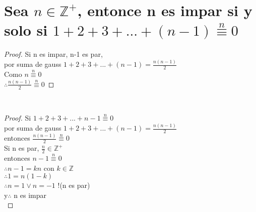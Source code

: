 \section{Sea $n\in \mathbb{Z}^+$, entonce n es impar si y solo si $1+2+3+...+(n-1) \stackrel{n}{\equiv} 0$}
\begin{proof}
    Si n es impar, n-1 es par,\\
    por suma de gauss $1+2+3+...+(n-1) =\frac{n(n-1)}{2}$\\
    Como  $n \stackrel{n}{ \equiv }0$\\
    $\therefore\frac{n(n-1)}{2}\stackrel{n}{ \equiv }0$
\end{proof}\\
\begin{proof}
    Si $ 1+2+3+...+n-1\stackrel{n}{ \equiv }0$\\
    por suma de gauss $1+2+3+...+(n-1) =\frac{n(n-1)}{2}$\\
    entonces  $\frac{n(n-1)}{2}\stackrel{n}{ \equiv }0$\\
    Si n es par, $\frac{n}{2}\in \mathbb{Z}^+$\\
    entonces $n-1\stackrel{n}{\equiv} 0$\\
    $\therefore n-1= kn$ con $k\in \mathbb{Z}$\\
    $\therefore 1= n(1-k)$\\
    $\therefore n = 1 \lor n = -1$ {\huge !}(n es par) \\ 
    y$\therefore$ n es impar\\
    
\end{proof}